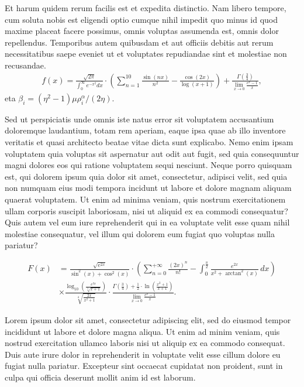 \documentclass[a0,portrait]{a0poster}
\newcommand{\pa}[1]{\left({#1}\right)}
\begin{document}
\begin{mdframed}[style=MyFrame]
\begin{multicols}{2}
Et harum quidem rerum facilis est et expedita distinctio. Nam libero tempore, cum soluta nobis est eligendi optio cumque nihil impedit quo minus id quod maxime placeat facere possimus, omnis voluptas assumenda est, omnis dolor repellendus. Temporibus autem quibusdam et aut officiis debitis aut rerum necessitatibus saepe eveniet ut et voluptates repudiandae sint et molestiae non recusandae.
%
\begin{equation}\label{eqn:L}
\begin{split}
	f(x) = \frac{\sqrt{2 \pi}}{\int_{0}^{\infty} e^{-x^2} dx} \cdot \left(\sum_{n=1}^{10} \frac{\sin(nx)}{n^2} - \frac{\cos(2x)}{\log(x+1)}\right) + \frac{\Gamma\left(\frac{3}{4}\right)}{\lim_{{x \to 0}} \frac{e^x - 1}{x}},
\end{split}
\end{equation}
%
eta $\beta_i = {\pa{\eta^{2}-1}\mu\rho_{i}^{\alpha}}/{\left({2\eta}\right)}$.

Sed ut perspiciatis unde omnis iste natus error sit voluptatem accusantium doloremque laudantium, totam rem aperiam, eaque ipsa quae ab illo inventore veritatis et quasi architecto beatae vitae dicta sunt explicabo. Nemo enim ipsam voluptatem quia voluptas sit aspernatur aut odit aut fugit, sed quia consequuntur magni dolores eos qui ratione voluptatem sequi nesciunt. Neque porro quisquam est, qui dolorem ipsum quia dolor sit amet, consectetur, adipisci velit, sed quia non numquam eius modi tempora incidunt ut labore et dolore magnam aliquam quaerat voluptatem. Ut enim ad minima veniam, quis nostrum exercitationem ullam corporis suscipit laboriosam, nisi ut aliquid ex ea commodi consequatur? Quis autem vel eum iure reprehenderit qui in ea voluptate velit esse quam nihil molestiae consequatur, vel illum qui dolorem eum fugiat quo voluptas nulla pariatur?

\begin{align}
    F(x) &= \frac{\sqrt{e^{2x}}}{\sin^2(x) + \cos^2(x)} \cdot \left(\sum_{n=0}^{+\infty} \frac{(2x)^n}{n!} - \int_{0}^{\frac{\pi}{2}} \frac{e^{2x}}{x^2 + \arctan^2(x)} \, dx\right) \nonumber \\
        &\times\frac{\log_{10}\left(\frac{e^{3x}}{\sqrt[3]{x+1}}\right)}{\sqrt[4]{\frac{2x}{x^2 + 1}}} \cdot \frac{\Gamma\left(\frac{3}{4}\right) + \frac{1}{2} \cdot \ln\left(\frac{x^2 + 1}{x+1}\right)}{\lim_{{x \to 0}} \frac{e^x - 1}{x}}.
\end{align}

Lorem ipsum dolor sit amet, consectetur adipiscing elit, sed do eiusmod tempor incididunt ut labore et dolore magna aliqua. Ut enim ad minim veniam, quis nostrud exercitation ullamco laboris nisi ut aliquip ex ea commodo consequat. Duis aute irure dolor in reprehenderit in voluptate velit esse cillum dolore eu fugiat nulla pariatur. Excepteur sint occaecat cupidatat non proident, sunt in culpa qui officia deserunt mollit anim id est laborum.


\end{multicols}
\end{mdframed}
\end{document}
